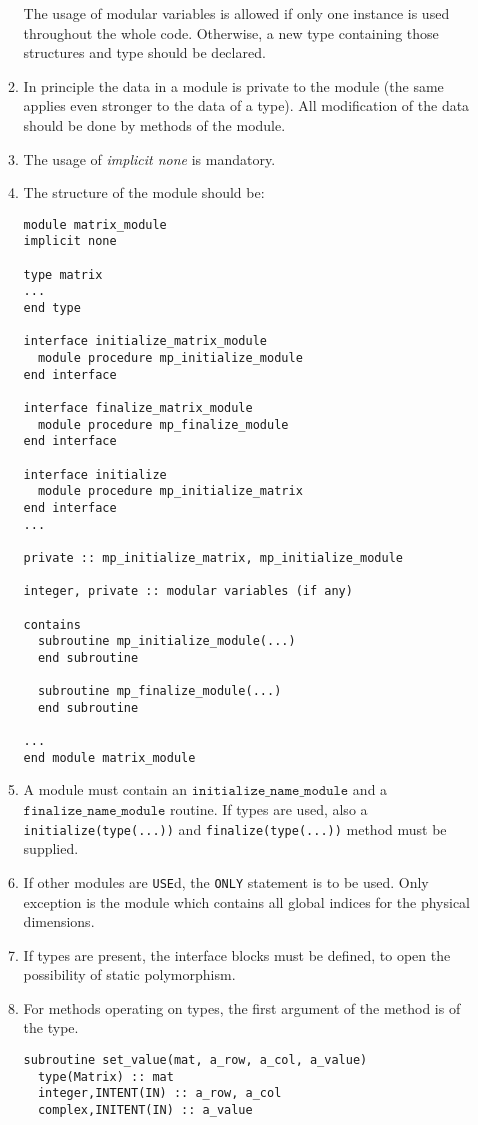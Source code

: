 \documentclass[12pt,a4paper]{article}
\begin{document}
\begin{enumerate}
\begin{enumerate}
    The usage of modular variables is allowed if only one instance is used 
    throughout the whole code. Otherwise, a new type containing those 
    structures and type should be declared.
  \item In principle the data in a module is private to the module (the same
    applies even stronger to the data of a type). All modification of the data
    should be done by methods of the module. 
  \item The usage of {\em implicit none} is mandatory.
  \item The structure of the module should be:\\
    \begin{minipage}{0.8\linewidth}
\begin{verbatim}
module matrix_module
implicit none

type matrix
...
end type

interface initialize_matrix_module
  module procedure mp_initialize_module
end interface

interface finalize_matrix_module
  module procedure mp_finalize_module
end interface

interface initialize
  module procedure mp_initialize_matrix
end interface
...

private :: mp_initialize_matrix, mp_initialize_module

integer, private :: modular variables (if any)

contains
  subroutine mp_initialize_module(...)
  end subroutine

  subroutine mp_finalize_module(...)
  end subroutine

...
end module matrix_module
\end{verbatim}
      \end{minipage}
    \item A module must contain an $\mathtt{initialize\_name\_module}$ and a
      $\mathtt{finalize\_name\_module}$ routine. If types 
      are used, also a \texttt{initialize(type(...))} and
      \texttt{finalize(type(...))} method must be supplied.
    \item If other modules are \texttt{USE}d, the \texttt{ONLY} statement is
      to be used. Only exception is the module which contains all global
      indices for the physical dimensions.
    \item If types are present, the interface blocks must be defined, to
      open the possibility of static polymorphism.
    \item For methods operating on types, the first argument of the method
        is of the type.\\
        \begin{minipage}{0.8\linewidth}
\begin{verbatim}
subroutine set_value(mat, a_row, a_col, a_value)
  type(Matrix) :: mat
  integer,INTENT(IN) :: a_row, a_col
  complex,INITENT(IN) :: a_value


\end{verbatim}
\end{minipage}
\end{enumerate}
\end{enumerate}
\end{document}
